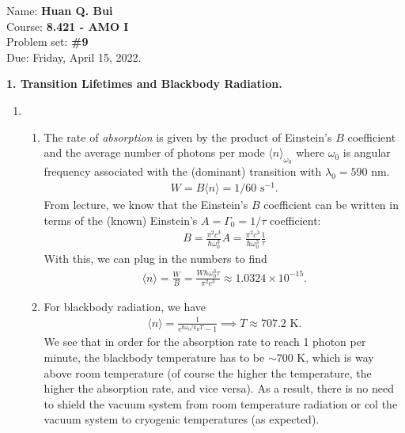 \documentclass{article}
\theoremstyle{definition}
\newcommand{\f}[2]{\frac{#1}{#2}}
\begin{document}
\begin{framed}
\noindent Name: \textbf{Huan Q. Bui}\\
Course: \textbf{8.421 - AMO I}\\
Problem set: \textbf{\#9}\\
Due: Friday, April 15, 2022.
\end{framed}



\textbf{1. Transition Lifetimes and Blackbody Radiation. }

\begin{enumerate}[label=(\alph*)]
	\item 
	
	\begin{enumerate}[label=(\roman*)]
		\item The rate of \textit{absorption} is given by the product of Einstein's $B$ coefficient and the average number of photons per mode $\langle n \rangle_{\omega_0}$ where $\omega_0$ is angular frequency associated with the (dominant) transition with $\lambda_0 = 590$ nm. 
		\begin{align*}
		W = B\langle n \rangle = 1/60 \text{ s}^{-1}.
		\end{align*} 
		From lecture, we know that the Einstein's $B$ coefficient can be written in terms of the (known) Einstein's $A = \Gamma_0 = 1/\tau$ coefficient:
		\begin{align*}
		B = \f{\pi^2 c^3}{\hbar \omega_0^3}A = \f{\pi^2 c^3}{\hbar \omega_0^3}\f{1}{\tau}
		\end{align*}
		With this, we can plug in the numbers to find 
		\begin{align*}
		\langle n \rangle = \f{W}{B} = \f{W \hbar \omega_0^3 \tau}{\pi^2 c^3} \approx 1.0324 \times 10^{-15}.
		\end{align*}
		
		
		
		\item For blackbody radiation, we have
		\begin{align*}
		\langle n \rangle = \f{1}{e^{\hbar \omega_0 / k_BT} - 1} \implies T\approx 707.2 \text{ K}.
		\end{align*}
		We see that in order for the absorption rate to reach 1 photon per minute, the blackbody temperature has to be $\sim 700$ K, which is way above room temperature (of course the higher the temperature, the higher the absorption rate, and vice versa). As a result, there is no need to shield the vacuum system from room temperature radiation or col the vacuum system to cryogenic temperatures (as expected).
	\end{enumerate}
	

\end{enumerate}
\end{document}
